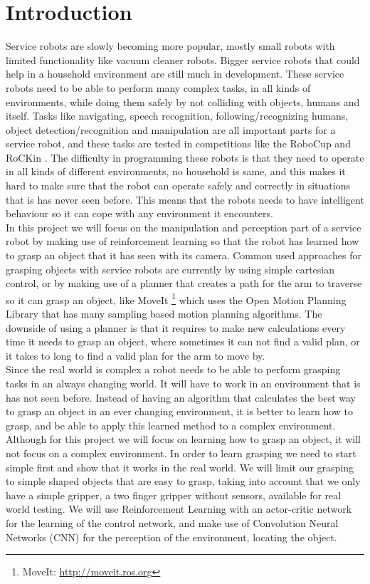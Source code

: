 \section{Introduction}
Service robots are slowly becoming more popular, mostly small robots with limited functionality like vacuum cleaner robots. Bigger service robots that could help in a household environment are still much in development. 
These service robots need to be able to perform many complex tasks, in all kinds of environments, while doing them safely by not colliding with objects, humans and itself.   
Tasks like navigating, speech recognition, following/recognizing humans, object detection/recognition and manipulation are all important parts for a service robot, 
and these tasks are tested in competitions like the RoboCup \cite{robocup} and RoCKin \cite{rockin}. The difficulty in programming these robots is that they need to operate in all kinds of different environments, no household is same, 
and this makes it hard to make sure that the robot can operate safely and correctly in situations that is has never seen before. This means that the robots needs to have intelligent behaviour so it can cope with any environment it encounters. \\
In this project we will focus on the manipulation and perception part of a service robot by making use of reinforcement learning so that the robot has learned how to grasp an object that it has seen with its camera.  
Common used approaches for grasping objects with service robots are currently by using simple cartesian control, or by making use of a planner that creates a path for the arm to traverse so it can grasp an object, 
like MoveIt \footnote{MoveIt: \url{http://moveit.ros.org}} which uses the Open Motion Planning Library \cite{ompl} that has many sampling based motion planning algorithms. 
The downside of using a planner is that it requires to make new calculations every time it needs to grasp an object, where sometimes it can not find a valid plan, or it takes to long to find a valid plan
for the arm to move by. \\
Since the real world is complex a robot needs to be able to perform grasping tasks in an always changing world. It will have to work in an environment that is has not seen before. Instead of having an algorithm that calculates
the best way to grasp an object in an ever changing environment, it is better to learn how to grasp, and be able to apply this learned method to a complex environment. Although for this project we will focus on learning 
how to grasp an object, it will not focus on a complex environment. In order to learn grasping we need to start simple first and show that it works in the real world. We will limit our grasping to simple shaped objects 
that are easy to grasp, taking into account that we only have a simple gripper, a two finger gripper without sensors, available for real world testing. We will use Reinforcement Learning with an actor-critic network for the learning 
of the control network, and make use of Convolution Neural Networks (CNN) \cite{cnn} for the perception of the environment, locating the object. 


